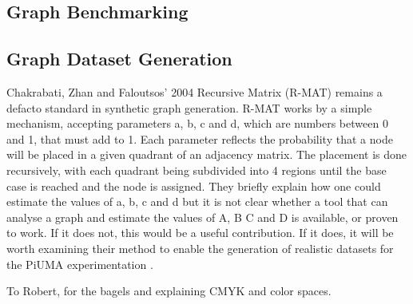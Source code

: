 \documentclass[sigconf,authordraft]{acmart}
\begin{document}
\subsection{Graph Benchmarking}

\subsection{Graph Dataset Generation}

\par{Chakrabati, Zhan and Faloutsos' 2004 Recursive Matrix (R-MAT) remains a defacto standard in synthetic graph generation. 
R-MAT works by a simple mechanism, accepting parameters a, b, c and d, which are numbers between 0 and 1, that must add to 1. 
Each parameter reflects the probability that a node will be placed in a given quadrant of an adjacency matrix. 
The placement is done recursively, with each quadrant being subdivided into 4 regions until the base case is reached and the node is assigned. 
They briefly explain how one could estimate the values of a, b, c and d but it is not clear whether a tool that can analyse a graph and estimate the values of A, B C and D is available, or proven to work. 
If it does not, this would be a useful contribution. 
If it does, it will be worth examining their method to enable the generation of realistic datasets for the PiUMA experimentation \cite{Chakrabati2004}.}

\begin{acks}
To Robert, for the bagels and explaining CMYK and color spaces.
\end{acks}




\end{document}
